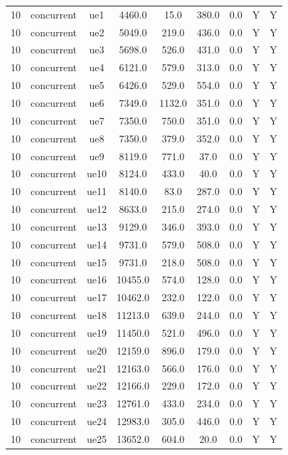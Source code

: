 \begin{table}[ht]
\begin{tabular}{|c|c|c|c|c|c|c|c|c|}
\hline
10 & concurrent & ue1 & 4460.0 & 15.0 & 380.0 & 0.0 & Y & Y \\
10 & concurrent & ue2 & 5049.0 & 219.0 & 436.0 & 0.0 & Y & Y \\
10 & concurrent & ue3 & 5698.0 & 526.0 & 431.0 & 0.0 & Y & Y \\
10 & concurrent & ue4 & 6121.0 & 579.0 & 313.0 & 0.0 & Y & Y \\
10 & concurrent & ue5 & 6426.0 & 529.0 & 554.0 & 0.0 & Y & Y \\
10 & concurrent & ue6 & 7349.0 & 1132.0 & 351.0 & 0.0 & Y & Y \\
10 & concurrent & ue7 & 7350.0 & 750.0 & 351.0 & 0.0 & Y & Y \\
10 & concurrent & ue8 & 7350.0 & 379.0 & 352.0 & 0.0 & Y & Y \\
10 & concurrent & ue9 & 8119.0 & 771.0 & 37.0 & 0.0 & Y & Y \\
10 & concurrent & ue10 & 8124.0 & 433.0 & 40.0 & 0.0 & Y & Y \\
10 & concurrent & ue11 & 8140.0 & 83.0 & 287.0 & 0.0 & Y & Y \\
10 & concurrent & ue12 & 8633.0 & 215.0 & 274.0 & 0.0 & Y & Y \\
10 & concurrent & ue13 & 9129.0 & 346.0 & 393.0 & 0.0 & Y & Y \\
10 & concurrent & ue14 & 9731.0 & 579.0 & 508.0 & 0.0 & Y & Y \\
10 & concurrent & ue15 & 9731.0 & 218.0 & 508.0 & 0.0 & Y & Y \\
10 & concurrent & ue16 & 10455.0 & 574.0 & 128.0 & 0.0 & Y & Y \\
10 & concurrent & ue17 & 10462.0 & 232.0 & 122.0 & 0.0 & Y & Y \\
10 & concurrent & ue18 & 11213.0 & 639.0 & 244.0 & 0.0 & Y & Y \\
10 & concurrent & ue19 & 11450.0 & 521.0 & 496.0 & 0.0 & Y & Y \\
10 & concurrent & ue20 & 12159.0 & 896.0 & 179.0 & 0.0 & Y & Y \\
10 & concurrent & ue21 & 12163.0 & 566.0 & 176.0 & 0.0 & Y & Y \\
10 & concurrent & ue22 & 12166.0 & 229.0 & 172.0 & 0.0 & Y & Y \\
10 & concurrent & ue23 & 12761.0 & 433.0 & 234.0 & 0.0 & Y & Y \\
10 & concurrent & ue24 & 12983.0 & 305.0 & 446.0 & 0.0 & Y & Y \\
10 & concurrent & ue25 & 13652.0 & 604.0 & 20.0 & 0.0 & Y & Y \\

\end{tabular}
\end{table}
